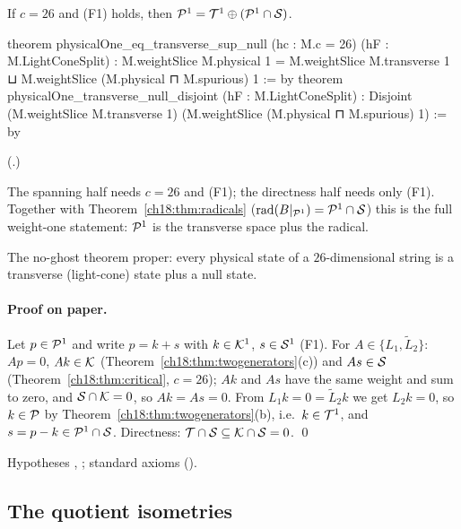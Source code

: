 \begin{theorem}\label{ch18:thm:A5}
If $c=26$ and (F1) holds, then $\mathcal{P}^1=\mathcal{T}^1\oplus(\mathcal{P}^1\cap\mathcal{S})$.
\end{theorem}
\begin{leancode}
theorem physicalOne_eq_transverse_sup_null (hc : M.c = 26) (hF : M.LightConeSplit) :
    M.weightSlice M.physical 1 = M.weightSlice M.transverse 1 ⊔
      M.weightSlice (M.physical ⊓ M.spurious) 1 := by
theorem physicalOne_transverse_null_disjoint (hF : M.LightConeSplit) :
    Disjoint (M.weightSlice M.transverse 1) (M.weightSlice (M.physical ⊓ M.spurious) 1) := by
\end{leancode}
(.)
\begin{dictionary}
The spanning half needs $c=26$ and (F1); the directness half needs only (F1).  Together with
Theorem~\ref{ch18:thm:radicals} ($\mathrm{rad}(B|_{\mathcal{P}^1})=\mathcal{P}^1\cap\mathcal{S}$) this is the full weight-one statement: $\mathcal{P}^1$ is the
transverse space plus the radical.
\end{dictionary}
\begin{physics}
The no-ghost theorem proper: every physical state of a $26$-dimensional string is a transverse
(light-cone) state plus a null state.
\end{physics}
\paragraph{Proof on paper.}  Let $p\in\mathcal{P}^1$ and write $p=k+s$ with $k\in\mathcal{K}^1$, $s\in\mathcal{S}^1$ (F1).  For
$A\in\{L_1,\widetilde L_2\}$: $Ap=0$, $Ak\in\mathcal{K}$ (Theorem~\ref{ch18:thm:twogenerators}(c)) and $As\in\mathcal{S}$
(Theorem~\ref{ch18:thm:critical}, $c=26$); $Ak$ and $As$ have the same weight and sum to zero, and
$\mathcal{S}\cap\mathcal{K}=0$, so $Ak=As=0$.  From $L_1k=0=\widetilde L_2k$ we get $L_2k=0$, so $k\in\mathcal{P}$ by
Theorem~\ref{ch18:thm:twogenerators}(b), i.e.\ $k\in\mathcal{T}^1$, and $s=p-k\in\mathcal{P}^1\cap\mathcal{S}$.  Directness: $\mathcal{T}\cap\mathcal{S}\subseteq\mathcal{K}\cap\mathcal{S}=0$. \qed
\begin{status}Hypotheses , ; standard axioms ().\end{status}

\subsection{The quotient isometries}


